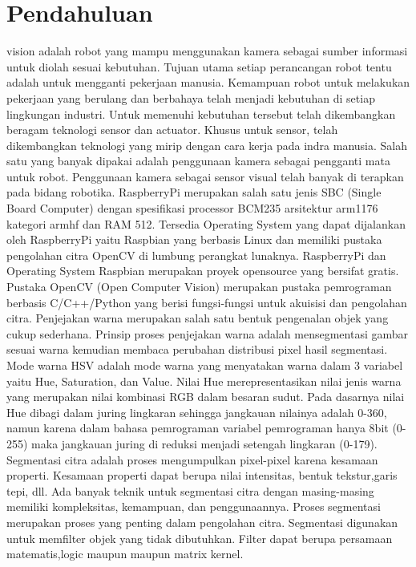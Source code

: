 \documentclass[10pt,journal,compsoc]{IEEEtran}
\begin{document}
 \section{Pendahuluan}
   vision adalah robot yang mampu menggunakan kamera sebagai sumber informasi untuk diolah sesuai kebutuhan. 
  Tujuan utama setiap perancangan robot tentu adalah untuk mengganti pekerjaan manusia. 
  Kemampuan robot untuk melakukan pekerjaan yang berulang dan berbahaya telah menjadi kebutuhan di setiap lingkungan industri.
  Untuk memenuhi kebutuhan tersebut telah dikembangkan beragam teknologi sensor dan actuator. 
  Khusus untuk sensor, telah dikembangkan teknologi yang mirip dengan cara kerja pada indra manusia. 
  Salah satu yang banyak dipakai adalah penggunaan kamera sebagai pengganti mata untuk robot.
  Penggunaan kamera sebagai sensor visual telah banyak di terapkan pada bidang robotika.
  RaspberryPi merupakan salah satu jenis SBC (Single Board Computer) dengan spesifikasi processor BCM235 arsitektur arm1176 kategori armhf dan RAM 512. 
  Tersedia Operating System yang dapat dijalankan oleh RaspberryPi yaitu Raspbian yang berbasis Linux dan memiliki pustaka pengolahan citra OpenCV di lumbung perangkat lunaknya. 
  RaspberryPi dan Operating System Raspbian merupakan proyek opensource yang bersifat gratis.
  Pustaka OpenCV (Open Computer Vision) merupakan pustaka pemrograman berbasis C/C++/Python yang berisi fungsi-fungsi untuk akuisisi dan pengolahan citra.
  Penjejakan warna merupakan salah satu bentuk pengenalan objek yang cukup sederhana. 
  Prinsip proses penjejakan warna adalah mensegmentasi gambar sesuai warna kemudian membaca perubahan distribusi pixel hasil segmentasi.
  Mode warna HSV adalah mode warna yang menyatakan warna dalam 3 variabel yaitu Hue, Saturation, dan Value.
  Nilai Hue merepresentasikan nilai jenis warna yang merupakan nilai kombinasi RGB dalam besaran sudut. 
  Pada dasarnya nilai Hue dibagi dalam juring lingkaran sehingga jangkauan nilainya adalah 0-360, 
  namun karena dalam bahasa pemrograman variabel pemrograman hanya 8bit (0-255) maka jangkauan juring di reduksi menjadi setengah lingkaran (0-179).
  Segmentasi citra adalah proses mengumpulkan pixel-pixel karena kesamaan properti. 
  Kesamaan properti dapat berupa nilai intensitas, bentuk tekstur,garis tepi, dll. 
  Ada banyak teknik untuk segmentasi citra dengan masing-masing memiliki kompleksitas, kemampuan, dan penggunaannya.
  Proses segmentasi merupakan proses yang penting dalam pengolahan citra.
  Segmentasi digunakan untuk memfilter objek yang tidak dibutuhkan. 
  Filter dapat berupa persamaan matematis,logic maupun maupun matrix kernel.
  
\end{document}
